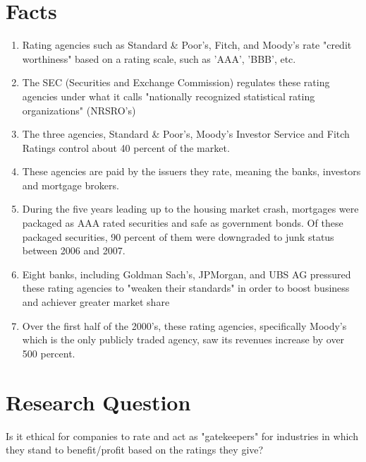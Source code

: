 \documentclass[11pt]{article}
\begin{document}
\section{Facts}
\begin{enumerate}
\item Rating agencies such as Standard \& Poor's, Fitch, and Moody's rate "credit worthiness" based on a rating scale, such as 'AAA', 'BBB', etc. \cite{CivilLiability}
\item The SEC (Securities and Exchange Commission) regulates these rating agencies under what it calls "nationally recognized statistical rating organizations" (NRSRO's) \cite{CivilLiability}
\item The three agencies, Standard \& Poor's, Moody's Investor Service and Fitch Ratings control about 40 percent of the market. \cite{smoothing}
\item These agencies are paid by the issuers they rate, meaning the banks, investors and mortgage brokers. \cite{gatekeepers}
\item During the five years leading up to the housing market crash, mortgages were packaged as AAA rated securities and safe as government bonds. Of these packaged securities, 90 percent of them were downgraded to junk status between 2006 and 2007. \cite{ratingEthics}
\item Eight banks, including Goldman Sach's, JPMorgan, and UBS AG pressured these rating agencies to "weaken their standards" in order to boost business and achiever greater market share \cite{ratingEthics}
\item Over the first half of the 2000's, these rating agencies, specifically Moody's which is the only publicly traded agency, saw its revenues increase by over 500 percent.  \cite{gatekeepers}
\end{enumerate}

\section{Research Question}
Is it ethical for companies to rate and act as "gatekeepers" for industries in which they stand to benefit/profit based on the ratings they give?

\end{document}
